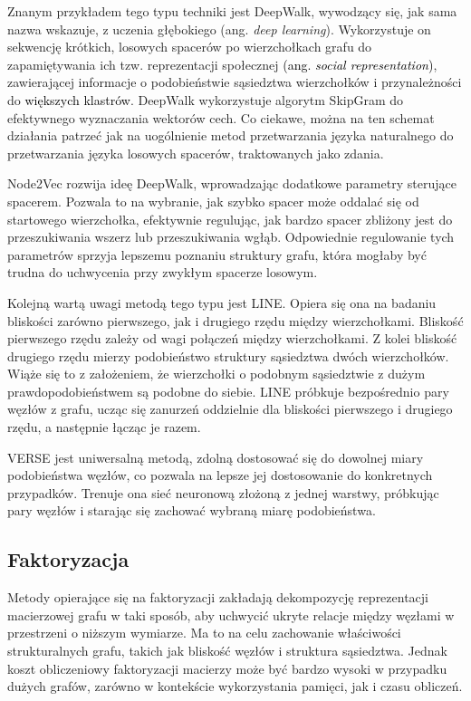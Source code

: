         Znanym przykładem tego typu techniki jest DeepWalk\cite{Perozzi_Al-Rfou_Skiena_2014}, wywodzący się, jak sama nazwa wskazuje, z uczenia głębokiego (ang. \textit{deep learning}). Wykorzystuje on sekwencję krótkich, losowych spacerów po wierzchołkach grafu do zapamiętywania ich tzw. reprezentacji społecznej \textcolor{black}{(ang. \textit{social representation})}, zawierającej informacje o podobieństwie sąsiedztwa wierzchołków i przynależności do \textcolor{black}{większych klastrów}. DeepWalk wykorzystuje algorytm SkipGram\cite{mikolov2013efficient} do efektywnego wyznaczania wektorów cech. Co ciekawe, można na ten schemat działania patrzeć jak na uogólnienie metod przetwarzania języka naturalnego do przetwarzania języka losowych spacerów, traktowanych jako zdania.
        
        Node2Vec\cite{Grover_Leskovec_2016} rozwija ideę DeepWalk, wprowadzając dodatkowe parametry sterujące spacerem. Pozwala to na wybranie, jak szybko spacer może oddalać się od startowego wierzchołka, efektywnie regulując, jak bardzo spacer zbliżony jest do przeszukiwania wszerz lub przeszukiwania wgłąb. Odpowiednie regulowanie tych parametrów sprzyja lepszemu poznaniu struktury grafu, która mogłaby być trudna do uchwycenia przy zwykłym spacerze losowym. 
        
        Kolejną wartą uwagi metodą tego typu jest LINE\cite{Tang_Qu_Wang_Zhang_Yan_Mei_2015}. Opiera się ona na badaniu bliskości zarówno pierwszego, jak i drugiego rzędu między wierzchołkami. Bliskość pierwszego rzędu zależy od wagi połączeń między wierzchołkami. Z kolei bliskość drugiego rzędu mierzy podobieństwo struktury sąsiedztwa dwóch wierzchołków. Wiąże się to z założeniem, że wierzchołki o podobnym sąsiedztwie z dużym prawdopodobieństwem są podobne do siebie. LINE próbkuje bezpośrednio pary węzłów z grafu, ucząc się zanurzeń oddzielnie dla bliskości pierwszego i drugiego rzędu, a następnie łącząc je razem. 
        
        VERSE\cite{Tsitsulin_Mottin_Karras_Müller_2018}
         jest uniwersalną metodą, zdolną dostosować się do dowolnej miary podobieństwa węzłów, co pozwala na lepsze jej dostosowanie do konkretnych przypadków. Trenuje ona sieć neuronową złożoną z jednej warstwy, próbkując pary węzłów i starając się zachować wybraną miarę podobieństwa.

    \subsection{Faktoryzacja}
        Metody opierające się na faktoryzacji zakładają dekompozycję reprezentacji macierzowej grafu w taki sposób, aby uchwycić ukryte relacje między węzłami w przestrzeni o niższym wymiarze. Ma to na celu zachowanie właściwości strukturalnych grafu, takich jak bliskość węzłów i struktura sąsiedztwa. Jednak koszt obliczeniowy faktoryzacji macierzy może być bardzo wysoki w przypadku dużych grafów, zarówno w kontekście wykorzystania pamięci, jak i czasu obliczeń.

